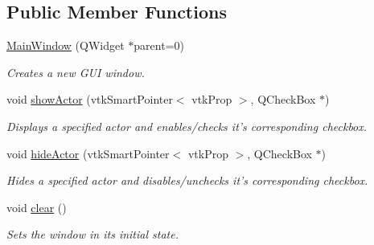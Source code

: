 \subsection*{Public Member Functions}
\begin{DoxyCompactItemize}
\item 
\hyperlink{classgui_1_1_main_window_a712499e7b9b3c9d440d7b19a8865fc9f}{MainWindow} (QWidget $\ast$parent=0)
\begin{DoxyCompactList}\small\item\em Creates a new GUI window. \item\end{DoxyCompactList}\item 
\hypertarget{classgui_1_1_main_window_ab2de68292a3940a0f7956eb0e999ee04}{
void \hyperlink{classgui_1_1_main_window_ab2de68292a3940a0f7956eb0e999ee04}{showActor} (vtkSmartPointer$<$ vtkProp $>$, QCheckBox $\ast$)}
\label{classgui_1_1_main_window_ab2de68292a3940a0f7956eb0e999ee04}

\begin{DoxyCompactList}\small\item\em Displays a specified actor and enables/checks it's corresponding checkbox. \item\end{DoxyCompactList}\item 
\hypertarget{classgui_1_1_main_window_a5c68f604a32a0c8584be5a7590ad49c4}{
void \hyperlink{classgui_1_1_main_window_a5c68f604a32a0c8584be5a7590ad49c4}{hideActor} (vtkSmartPointer$<$ vtkProp $>$, QCheckBox $\ast$)}
\label{classgui_1_1_main_window_a5c68f604a32a0c8584be5a7590ad49c4}

\begin{DoxyCompactList}\small\item\em Hides a specified actor and disables/unchecks it's corresponding checkbox. \item\end{DoxyCompactList}\item 
\hypertarget{classgui_1_1_main_window_a4fd3872bcad0814f6e4bcc07fa9889bd}{
void \hyperlink{classgui_1_1_main_window_a4fd3872bcad0814f6e4bcc07fa9889bd}{clear} ()}
\label{classgui_1_1_main_window_a4fd3872bcad0814f6e4bcc07fa9889bd}

\begin{DoxyCompactList}\small\item\em Sets the window in its initial state. \item\end{DoxyCompactList}\end{DoxyCompactItemize}
